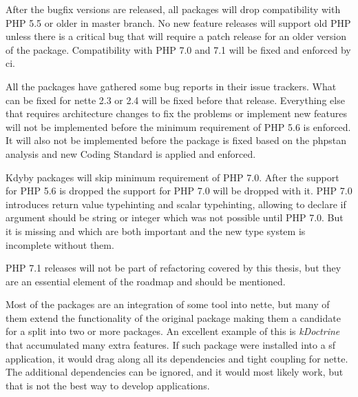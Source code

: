 
After the bugfix versions are released, all packages will drop compatibility with PHP 5.5 or older in master branch. No new feature releases will support old PHP unless there is a critical bug that will require a patch release for an older version of the package. Compatibility with PHP 7.0 and 7.1 will be fixed and enforced by \gls{ci}.

All the packages have gathered some bug reports in their issue trackers. What can be fixed for \gls{nette} 2.3 or 2.4 will be fixed before that release. Everything else that requires architecture changes to fix the problems or implement new features will not be implemented before the minimum requirement of PHP 5.6 is enforced. It will also not be implemented before the package is fixed based on the \gls{phpstan} analysis and new Coding Standard is applied and enforced.


Kdyby packages will skip minimum requirement of PHP 7.0. After the support for PHP 5.6 is dropped the support for PHP 7.0 will be dropped with it. PHP 7.0 introduces return value typehinting and scalar typehinting, allowing to declare if argument should be string or integer which was not possible until PHP 7.0. But it is missing  and  which are both important and the new type system is incomplete without them.

PHP 7.1 releases will not be part of refactoring covered by this thesis, but they are an essential element of the roadmap and should be mentioned.


Most of the packages are an integration of some tool into \gls{nette}, but many of them extend the functionality of the original package making them a candidate for a split into two or more packages. An excellent example of this is \textit{\gls{kDoctrine}} that accumulated many extra features. If such package were installed into a \gls{sf} application, it would drag along all its dependencies and tight coupling for \gls{nette}. The additional dependencies can be ignored, and it would most likely work, but that is not the best way to develop applications.


